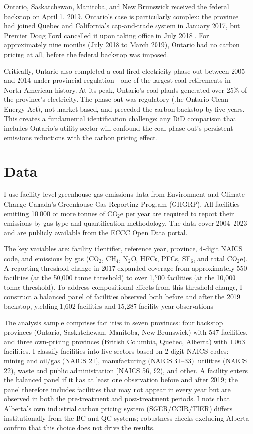 \documentclass[12pt]{article}
\begin{document}
Ontario, Saskatchewan, Manitoba, and New Brunswick received the federal backstop on April 1, 2019. Ontario's case is particularly complex: the province had joined Quebec and California's cap-and-trade system in January 2017, but Premier Doug Ford cancelled it upon taking office in July 2018 \citep{rivers_2017}. For approximately nine months (July 2018 to March 2019), Ontario had no carbon pricing at all, before the federal backstop was imposed.

Critically, Ontario also completed a coal-fired electricity phase-out between 2005 and 2014 under provincial regulation---one of the largest coal retirements in North American history. At its peak, Ontario's coal plants generated over 25\% of the province's electricity. The phase-out was regulatory (the Ontario Clean Energy Act), not market-based, and preceded the carbon backstop by five years. This creates a fundamental identification challenge: any DiD comparison that includes Ontario's utility sector will confound the coal phase-out's persistent emissions reductions with the carbon pricing effect.


\section{Data}

I use facility-level greenhouse gas emissions data from Environment and Climate Change Canada's Greenhouse Gas Reporting Program (GHGRP). All facilities emitting 10,000 or more tonnes of CO$_2$e per year are required to report their emissions by gas type and quantification methodology. The data cover 2004--2023 and are publicly available from the ECCC Open Data portal.

The key variables are: facility identifier, reference year, province, 4-digit NAICS code, and emissions by gas (CO$_2$, CH$_4$, N$_2$O, HFCs, PFCs, SF$_6$, and total CO$_2$e). A reporting threshold change in 2017 expanded coverage from approximately 550 facilities (at the 50,000 tonne threshold) to over 1,700 facilities (at the 10,000 tonne threshold). To address compositional effects from this threshold change, I construct a balanced panel of facilities observed both before and after the 2019 backstop, yielding 1,602 facilities and 15,287 facility-year observations.

The analysis sample comprises facilities in seven provinces: four backstop provinces (Ontario, Saskatchewan, Manitoba, New Brunswick) with 547 facilities, and three own-pricing provinces (British Columbia, Quebec, Alberta) with 1,063 facilities. I classify facilities into five sectors based on 2-digit NAICS codes: mining and oil/gas (NAICS 21), manufacturing (NAICS 31--33), utilities (NAICS 22), waste and public administration (NAICS 56, 92), and other. A facility enters the balanced panel if it has at least one observation before and after 2019; the panel therefore includes facilities that may not appear in every year but are observed in both the pre-treatment and post-treatment periods. I note that Alberta's own industrial carbon pricing system (SGER/CCIR/TIER) differs institutionally from the BC and QC systems; robustness checks excluding Alberta confirm that this choice does not drive the results.
\end{document}

